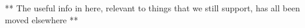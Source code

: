 ** The useful info in here, relevant to things that we still support, has all been moved elsewhere **
%
%
%
%
%
%
